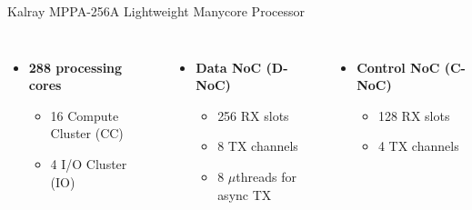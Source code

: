 		\begin{frame}[fragile]{Kalray MPPA-256}{A Lightweight Manycore Processor}


			\begin{columns}[totalwidth=\linewidth]


					\begin{itemize}
						\item \textbf{288 processing cores}
						\begin{itemize}
							\item {16 Compute Cluster (CC)}
							\item {4 I/O Cluster (IO)}
						\end{itemize}
					\end{itemize}

					\vspace{0.5cm}

					\begin{itemize}
						\item \textbf{Data NoC (D-NoC)}
						\begin{itemize}
							\item 256 RX slots
							\item 8 TX channels
							\item 8 $\mu$threads for async TX
						\end{itemize}
					\end{itemize}

					\vspace{0.5cm}

					\begin{itemize}
						\item \textbf{Control NoC (C-NoC)}
						\begin{itemize}
							\item 128 RX slots
							\item 4 TX channels
						\end{itemize}
					\end{itemize}

			\end{columns}

		\end{frame}

